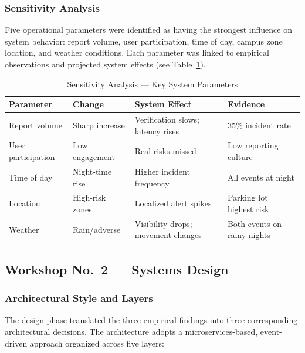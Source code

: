 \documentclass[11pt,a4paper]{article}
\begin{document}
\subsubsection{Sensitivity Analysis}

Five operational parameters were identified as having the strongest influence on system behavior: report volume, user participation, time of day, campus zone location, and weather conditions. Each parameter was linked to empirical observations and projected system effects (see Table~\ref{tab:sensitivity}).

\begin{table}[H]
\centering
\caption{Sensitivity Analysis --- Key System Parameters}
\label{tab:sensitivity}
\small
\begin{tabularx}{\textwidth}{l l X l}
\toprule
\textbf{Parameter} & \textbf{Change} & \textbf{System Effect} & \textbf{Evidence} \\
\midrule
Report volume & Sharp increase & Verification slows; latency rises & 35\% incident rate \\
User participation & Low engagement & Real risks missed & Low reporting culture \\
Time of day & Night-time rise & Higher incident frequency & All events at night \\
Location & High-risk zones & Localized alert spikes & Parking lot = highest risk \\
Weather & Rain/adverse & Visibility drops; movement changes & Both events on rainy nights \\
\bottomrule
\end{tabularx}
\end{table}

\subsection{Workshop No.\ 2 --- Systems Design}

\subsubsection{Architectural Style and Layers}

The design phase translated the three empirical findings into three corresponding architectural decisions. The architecture adopts a microservices-based, event-driven approach organized across five layers:
\end{document}

